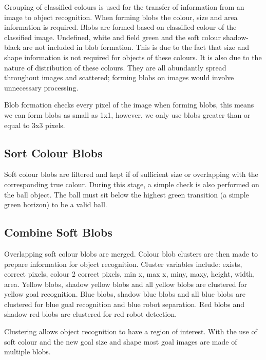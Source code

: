 Grouping of classified colours is used for the transfer of information from an image to object recognition. When forming blobs the colour, size and area information is required. Blobs are formed based on classified colour of the classified image. Undefined, white and field green and the soft colour shadow-black are not included in blob formation. This is due to the fact that size and shape information is not required for objects of these colours. It is also due to the nature of distribution of these colours. They are all abundantly spread throughout images and scattered; forming blobs on images would involve unnecessary processing. 

Blob formation checks every pixel of the image when forming blobs, this means we can form blobs as small as 1x1, however, we only use blobs greater than or equal to 3x3 pixels. 

\subsection{Sort Colour Blobs}

Soft colour blobs are filtered and kept if of sufficient size or overlapping with the corresponding true colour. During this stage, a simple check is also performed on the ball object. The ball must sit below the highest green transition (a simple green horizon) to be a valid ball.

\subsection{Combine Soft Blobs}

Overlapping soft colour blobs are merged. Colour blob clusters are then made to prepare information for object recognition. Cluster variables include: exists, correct pixels, colour 2 correct pixels, min x, max x, miny, maxy, height, width, area. 
Yellow blobs, shadow yellow blobs and all yellow blobs are clustered for yellow goal recognition. Blue blobs, shadow blue blobs and all blue blobs are clustered for blue goal recognition and blue robot separation. Red blobs and shadow red blobs are clustered for red robot detection.

Clustering allows object recognition to have a region of interest. With the use of soft colour and the new goal size and shape most goal images are made of multiple blobs.
